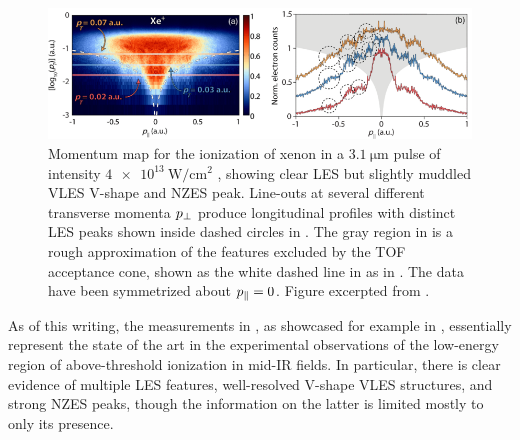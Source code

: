 \begin{figure}[htb]
  \centering
  \subfloat{\label{f6-wolter-prx-original-figure-a}}
  \subfloat{\label{f6-wolter-prx-original-figure-b}}
  \includegraphics[width=\textwidth]{6-LES/Figures/figure6G.png}
  \caption[
  Measured photoelectron momentum map showing multiple members of the LES series, observed by Wolter et al.
  ]{
  Momentum map \protect{} for the ionization of xenon in a $\SI{3.1}{\micro\meter}$ pulse of intensity $\SI{4e13}{\watt/\centi\meter^2}$ \cite{Wolter_PRX}, showing clear LES but slightly muddled VLES V-shape and NZES peak. Line-outs at several different transverse momenta ${p_{\perp}}$ produce longitudinal profiles with distinct LES peaks shown inside dashed circles in \protect{}. The gray region in \protect{} is a rough approximation of the features excluded by the TOF acceptance cone, shown as the white dashed line in \protect{} as in . The data have been symmetrized about ${p_{\parallel}}=0$. 
  Figure excerpted from .
  }
\label{f6-wolter-prx-original-figure}
\end{figure}

As of this writing, the measurements in , as showcased for example in , essentially represent the state of the art in the experimental observations of the low-energy region of above-threshold ionization in mid-IR fields. In particular, there is clear evidence of multiple LES features, well-resolved V-shape VLES structures, and strong NZES peaks, though the information on the latter is limited mostly to only its presence.




